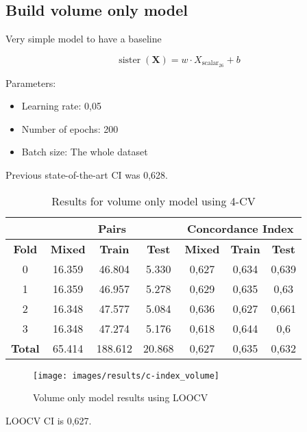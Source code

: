 \subsection{Build volume only model}
\begin{frame}{\insertsubsec}
  Very simple model to have a baseline

  \[
    \operatorname{sister}(\bm{X}) = w\cdot X_{\text{scalar}_{26}} + b
  \]
\end{frame}
\begin{frame}
  Parameters:
  \begin{itemize}
    \item Learning rate: 0,05
    \item Number of epochs: 200
    \item Batch size: The whole dataset
  \end{itemize}

  Previous state-of-the-art CI was 0,628.

  \begin{table}
    \centering
    \begin{tabular}{|c||c|c|c||c|c|c|}
      \cline{2-7}
      \multicolumn{1}{c|}{} & \multicolumn{3}{|c||}{\textbf{Pairs}} & 
      \multicolumn{3}{c|}{\textbf{Concordance Index}} \\
      \hline
      \textbf{Fold} & \textbf{Mixed} & \textbf{Train} & \textbf{Test} 
      & \textbf{Mixed} & \textbf{Train} & \textbf{Test} \\
      \hhline{=======}
      0 & 16.359 & 46.804 & 5.330 & 0,627 & 0,634 & 0,639 \\
      1 & 16.359 & 46.957 & 5.278 & 0,629 & 0,635 & 0,63 \\
      2 & 16.348 & 47.577 & 5.084 & 0,636 & 0,627 & 0,661 \\
      3 & 16.348 & 47.274 & 5.176 & 0,618 & 0,644 & 0,6 \\
      \hhline{=======}
      \textbf{Total} & 65.414 & 188.612 & 20.868 & 0,627 & 0,635 & 0,632 \\
      \hline
    \end{tabular}
  
    \caption[Volume Only 4-CV results]{
      Results for volume only model using 4-CV \label{tab:results-volume-4CV}
    }
  \end{table}
\end{frame}

\begin{frame}
  \begin{figure}
    \centering
    \texttt{[image: images/results/c-index\_volume]}
    \caption[LOOCV volume only model results]{
      Volume only model results using LOOCV \label{fig:results-volume-LOOCV}
    }
  \end{figure}
  LOOCV CI is 0,627.
\end{frame}

